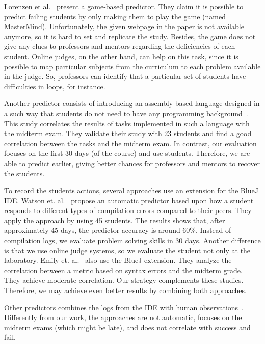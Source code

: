 Lorenzen et al.~\cite{lorenzenC06-mastermind-predictor-sigcse2008} present a game-based predictor. They claim it is possible to predict failing students by only making them to play the game (named MasterMind). Unfortunately, the given webpage in the paper is not available anymore, so it is hard to set and replicate the study. Besides, the game does not give any clues to professors and mentors regarding the deficiencies of each student. Online judges, on the other hand, can help on this task, since it is possible to map particular subjects from the curriculum to each problem available in the judge. So, professors can identify that a particular set of students have difficulties in loops, for instance.

Another predictor consists of introducing an assembly-based language designed in a such way that students do not need to have any programming background~\cite{harris-assembly-jcsc2014}. This study correlates the results of tasks implemented in such a language with the midterm exam. They validate their study with 23 students and find a good correlation between the tasks and the midterm exam. In contrast, our evaluation focuses on the first 30 days (\semesterPercentage of the course) and use \totalStudents students. Therefore, we are able to predict earlier, giving better chances for professors and mentors to recover the students.


To record the students actions, several approaches use an extension for the BlueJ IDE. Watson et. al.~\cite{watson-icalt-2013} propose an automatic predictor based upon how a student responds to different types of compilation errors compared to their peers. They apply the approach by using 45 students. The results shows that, after approximately 45 days, the predictor accuracy is around 60\%. Instead of compilation logs, we evaluate problem solving skills in 30 days. Another difference is that we use online judge systems, so we evaluate the student not only at the laboratory.  Emily et. al.~\cite{emily-up-2008, emily-icer-2011} also use the BlueJ extension. They analyze the correlation between a metric based on syntax errors and the midterm grade. They achieve moderate correlation. Our strategy complements these studies. Therefore, we may achieve even better results by combining both approaches.

Other predictors combines the logs from the IDE with human observations~\cite{diane-acii-2011, rodrigo-behavioral-ITiCSE2009}. Differently from our work, the approaches are not automatic, focuses on the midterm exams (which might be late), and does not correlate with success and fail.


